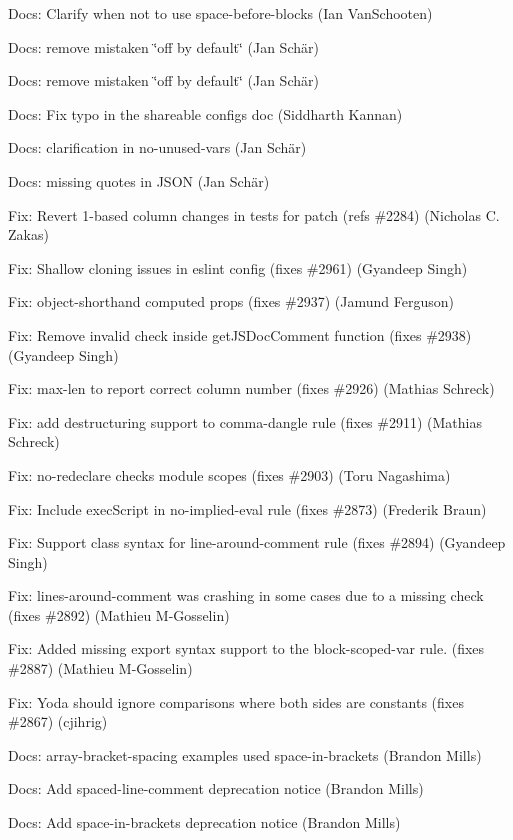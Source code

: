 \begin{DoxyItemize}
\item Docs\+: Clarify when not to use space-\/before-\/blocks (Ian Van\+Schooten)
\item Docs\+: remove mistaken \char`\"{}off by default\char`\"{} (Jan Schär)
\item Docs\+: remove mistaken \char`\"{}off by default\char`\"{} (Jan Schär)
\item Docs\+: Fix typo in the shareable configs doc (Siddharth Kannan)
\item Docs\+: clarification in no-\/unused-\/vars (Jan Schär)
\item Docs\+: missing quotes in J\+S\+ON (Jan Schär)
\item Fix\+: Revert 1-\/based column changes in tests for patch (refs \#2284) (Nicholas C. Zakas)
\item Fix\+: Shallow cloning issues in eslint config (fixes \#2961) (Gyandeep Singh)
\item Fix\+: object-\/shorthand computed props (fixes \#2937) (Jamund Ferguson)
\item Fix\+: Remove invalid check inside {\ttfamily get\+J\+S\+Doc\+Comment} function (fixes \#2938) (Gyandeep Singh)
\item Fix\+: max-\/len to report correct column number (fixes \#2926) (Mathias Schreck)
\item Fix\+: add destructuring support to comma-\/dangle rule (fixes \#2911) (Mathias Schreck)
\item Fix\+: {\ttfamily no-\/redeclare} checks module scopes (fixes \#2903) (Toru Nagashima)
\item Fix\+: Include exec\+Script in no-\/implied-\/eval rule (fixes \#2873) (Frederik Braun)
\item Fix\+: Support class syntax for line-\/around-\/comment rule (fixes \#2894) (Gyandeep Singh)
\item Fix\+: lines-\/around-\/comment was crashing in some cases due to a missing check (fixes \#2892) (Mathieu M-\/\+Gosselin)
\item Fix\+: Added missing export syntax support to the block-\/scoped-\/var rule. (fixes \#2887) (Mathieu M-\/\+Gosselin)
\item Fix\+: Yoda should ignore comparisons where both sides are constants (fixes \#2867) (cjihrig)
\item Docs\+: array-\/bracket-\/spacing examples used space-\/in-\/brackets (Brandon Mills)
\item Docs\+: Add spaced-\/line-\/comment deprecation notice (Brandon Mills)
\item Docs\+: Add space-\/in-\/brackets deprecation notice (Brandon Mills)
\end{DoxyItemize}

